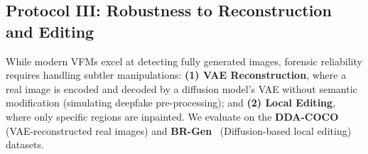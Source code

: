 \documentclass[sigconf,screen]{acmart}
\theoremstyle{plain}
\theoremstyle{definition}
\theoremstyle{remark}
\begin{document}

\subsection{Protocol III: Robustness to Reconstruction and Editing}
\label{subsec:robust_edit}

While modern VFMs excel at detecting fully generated images, forensic reliability requires handling subtler manipulations: \textbf{(1) VAE Reconstruction}, where a real image is encoded and decoded by a diffusion model's VAE without semantic modification (simulating deepfake pre-processing); and \textbf{(2) Local Editing}, where only specific regions are inpainted. We evaluate on the \textbf{DDA-COCO}~\cite{chen2025dual} (VAE-reconstructed real images) and \textbf{BR-Gen} ~\cite{cai2025zooming}(Diffusion-based local editing) datasets.

\begin{table}[t]
\centering
\caption{\textbf{Limitations under Reconstruction and Editing.} Detection accuracy on \textbf{DDA-COCO} (VAE-based reconstruction) and \textbf{BR-Gen} (Diffusion-based local editing).}
\label{tab:recon_edit}
\vspace{-10pt}
\end{table}
\end{document}
